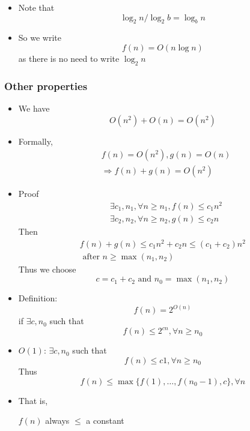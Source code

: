 \begin{frame}[allowframebreaks]
\begin{itemize}
\item Note that
  \begin{equation*}
 \log_2 n / \log_2 b= \log_b n
\end{equation*}
\item So we write
  \begin{equation*}
  f(n)=O(n\log n)
\end{equation*}
as there is no need to write $\log_2 n$
\end{itemize}\end{frame} \begin{frame}[allowframebreaks] \frametitle{Other properties}
  \begin{itemize}
  \item We have
    \begin{equation*}
    O(n^2) + O(n) = O(n^2)
  \end{equation*}
\item Formally,
  \begin{equation*}
    \begin{split}
      & f(n) = O(n^2), g(n) = O(n)\\
      & \Rightarrow f(n) + g(n) = O(n^2)
    \end{split}
  \end{equation*}
\item Proof
  \begin{equation*}
    \begin{split}
      & \exists c_1, n_1, \forall n \geq n_1, f(n) \leq c_1 n^2 \\
      & \exists c_2, n_2, \forall n \geq n_2, g(n) \leq c_2 n
    \end{split}
  \end{equation*}
Then
\begin{gather*}
  f(n) + g(n) \leq c_1 n^2 + c_2 n \leq (c_1+c_2) n^2\\
  \text{ after } n \geq \max (n_1, n_2)
\end{gather*}
Thus we choose
\begin{equation*}
  c = c_1 + c_2 \text{ and } n_0 = \max(n_1, n_2)
\end{equation*}
\item Definition:
  \begin{equation*}
f(n) =  2^{O(n)}
\end{equation*}
if
$\exists c, n_0$ such that
\begin{equation*}
f(n) \leq 2^{cn}, \forall n \geq n_0
\end{equation*}
\item $O(1)$: $\exists c, n_0$ such that 
  \begin{equation*}
f(n)   \leq c 1, \forall n \geq n_0
\end{equation*}
Thus
\begin{equation*}
  f(n) \leq
  \max \{f(1), \ldots, f(n_0-1), c\}, \forall n
\end{equation*}
\item That is,
  \begin{center}
  $f(n)$ always $\leq$ a constant
\end{center}
\end{itemize}\end{frame}



